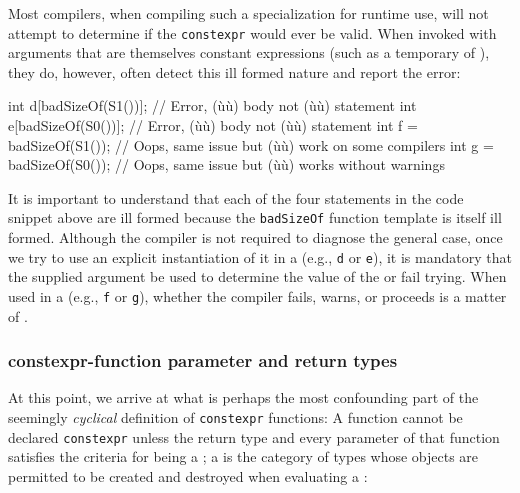 \noindent Most compilers, when compiling such a specialization for runtime use,
will not attempt to determine if the \lstinline!constexpr! would ever be
valid. When invoked with arguments that are themselves constant
expressions (such as a temporary of ), they do,
however, often detect this ill formed nature and report the error:

\begin{emcppslisting}[emcppsbatch=e7,emcppsignore={all fail somewhere}]
int d[badSizeOf(S1())];  // Error, (ù{}ù) body not (ù{}ù) statement
int e[badSizeOf(S0())];  // Error, (ù{}ù) body not (ù{}ù) statement
int f = badSizeOf(S1()); // Oops, same issue but (ù{}ù) work on some compilers
int g = badSizeOf(S0()); // Oops, same issue but (ù{}ù) works without warnings
\end{emcppslisting}


\noindent It is important to understand that each of the four statements in the
code snippet above are ill formed because the \lstinline!badSizeOf!
function template is itself ill formed. Although the compiler is not
required to diagnose the general case, once we try to use an explicit
instantiation of it in a  (e.g.,
\lstinline!d! or \lstinline!e!), it is mandatory that the supplied argument be
used to determine the value of the  or fail
trying. When used in a  (e.g.,
\lstinline!f! or \lstinline!g!), whether the compiler fails, warns, or
proceeds is a matter of .

\subsubsection[\lstinline!constexpr!-function parameter and return types]{{\SubsubsecCode constexpr}-function parameter and return types}\label{constexpr-function-parameter-and-return-types}

At this point, we arrive at what is perhaps the most confounding part of
the seemingly \emph{cyclical} definition of \lstinline!constexpr!
functions: A function cannot be declared \lstinline!constexpr! unless the
return type and every parameter of that function satisfies the criteria
for being a ; a  is the
category of types whose objects are permitted to be created and
destroyed when evaluating a :

